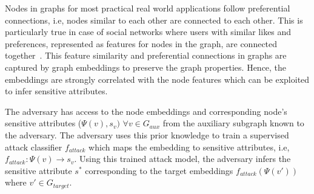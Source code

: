 Nodes in graphs for most practical real world applications follow preferential connections, i.e, nodes similar to each other are connected to each other.
This is particularly true in case of social networks where users with similar likes and preferences, represented as features for nodes in the graph, are connected together~\cite{socialinfer,socialinfer2}.
This feature similarity and preferential connections in graphs are captured by graph embeddings to preserve the graph properties.
Hence, the embeddings are strongly correlated with the node features which can be exploited to infer sensitive attributes.

The adversary has access to the node embeddings and corresponding node's sensitive attributes ($\Psi (v), s_{v})$ $\forall v \in G_{aux}$ from the auxiliary subgraph known to the adversary.
The adversary uses this prior knowledge to train a supervised attack classifier $f_{attack}$ which maps the embedding to sensitive attributes, i.e, $f_{attack}: \Psi (v) \rightarrow s_{v}$.
Using this trained attack model, the adversary infers the sensitive attribute $s^*$ corresponding to the target embeddings $f_{attack}(\Psi(v'))$ where $v' \in G_{target}$.
